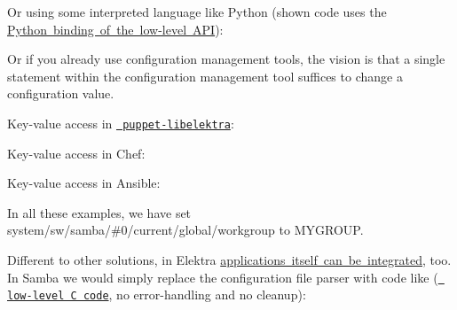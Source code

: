 Or using some interpreted language like Python (shown code uses the \mbox{\hyperlink{doc_tutorials_python-kdb_md}{Python binding of the low-\/level A\+PI}})\+:


\begin{DoxyCode}{0}
\end{DoxyCode}


Or if you already use configuration management tools, the vision is that a single statement within the configuration management tool suffices to change a configuration value.

Key-\/value access in \href{https://puppet.libelektra.org}{\texttt{ puppet-\/libelektra}}\+:


\begin{DoxyCode}{0}
\DoxyCodeLine{\}}
\end{DoxyCode}


Key-\/value access in Chef\+:


\begin{DoxyCode}{0}
\end{DoxyCode}


Key-\/value access in Ansible\+:


\begin{DoxyCode}{0}
\end{DoxyCode}


In all these examples, we have set {\ttfamily system/sw/samba/\#0/current/global/workgroup} to {\ttfamily M\+Y\+G\+R\+O\+UP}.

Different to other solutions, in Elektra \mbox{\hyperlink{doc_tutorials_application-integration_md}{applications itself can be integrated}}, too. In Samba we would simply replace the configuration file parser with code like (\href{https://doc.libelektra.org/api/current/html/group__key.html}{\texttt{ low-\/level C code}}, no error-\/handling and no cleanup)\+:


